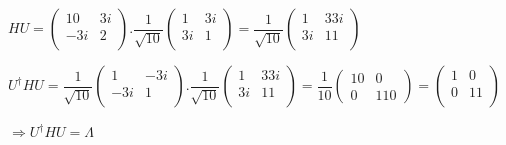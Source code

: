 \documentclass[fleqn]{article}
\begin{document}
\begin{enumerate}
      \textcolor{hwColor}{
        $
          HU=\begin{pmatrix}
            10 & 3i \\
            -3i & 2 \\
          \end{pmatrix}.
          \dfrac{1}{\sqrt{10}}\begin{pmatrix}
            1 & 3i \\
            3i & 1 \\
          \end{pmatrix}=\dfrac{1}{\sqrt{10}}\begin{pmatrix}
            1 & 33i \\
            3i & 11 \\
          \end{pmatrix}
        $
      }

      \bigbreak

      \textcolor{hwColor}{
        $
          U^\dagger HU=\dfrac{1}{\sqrt{10}}\begin{pmatrix}
            1 & -3i \\
            -3i & 1 \\
          \end{pmatrix}.\dfrac{1}{\sqrt{10}}\begin{pmatrix}
            1 & 33i \\
            3i & 11 \\
          \end{pmatrix}=\dfrac{1}{10}\begin{pmatrix}
            10 & 0 \\
            0 & 110
          \end{pmatrix}=\begin{pmatrix}
            1 & 0 \\
            0 & 11 \\
          \end{pmatrix}
        $
      }

      \bigbreak

      \textcolor{hwColor}{
        $
          \Longrightarrow
          U^\dagger HU=\Lambda
        $
      }
      
  \end{enumerate}
\end{document}
